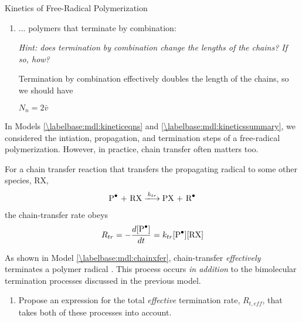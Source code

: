 \begin{activity}{Kinetics of Free-Radical Polymerization}
\begin{ctqs}
\begin{enumerate}
			\item ... polymers that terminate by combination:
			
				\emph{Hint: does termination by combination change the lengths of the chains?  If so, how?}
				
				\begin{solution}[0.75in]
					Termination by combination effectively doubles the length of the chains, so we should have 
					
					$N_n = 2\bar v$
				\end{solution}
		
		\end{enumerate}

\end{ctqs}

		
\clearpage
\begin{model}
\label{\labelbase:mdl:chainxfer}

	In Models \ref{\labelbase:mdl:kineticeqns} and \ref{\labelbase:mdl:kineticssummary}, we considered the intiation, propagation, and termination steps of a free-radical polymerization.  However, in practice, chain transfer often matters too.
	
	For a chain transfer reaction that transfers the propagating radical to some other species, RX,
	\begin{align*}
		\text{\ce{P^.} + RX} \xlongrightarrow{k_{tr}} \text{PX + \ce{R^.}}
	\end{align*}
	the chain-transfer rate obeys
	\begin{align*}
		R_{tr} = -\frac{d[\text{\ce{P^.}}]}{dt} = k_{tr}\text{[\ce{P^.}][RX]}
	\end{align*}
	
\end{model}

\begin{ctqs}
	\question As shown in Model \ref{\labelbase:mdl:chainxfer}, chain-transfer \emph{effectively} terminates a polymer radical .  This process occurs \emph{in addition} to the bimolecular termination processes discussed in the previous model.
	
		\begin{enumerate}
			\item Propose an expression for the total \emph{effective} termination rate, $R_{t,eff}$, that takes both of these processes into account.
		
		\begin{solution}[0.5in]
	

\end{solution}
\end{enumerate}
\end{ctqs}
\end{activity}
